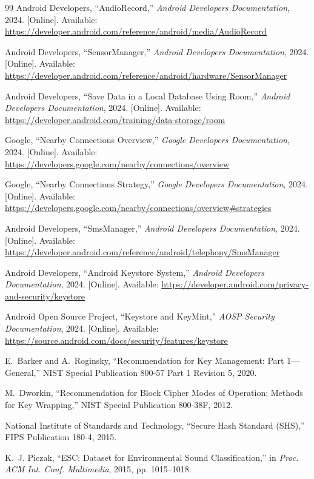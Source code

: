 \documentclass[conference]{IEEEtran}
\begin{document}
\begin{thebibliography}{99}
Android Developers, ``AudioRecord,'' \emph{Android Developers Documentation}, 2024. [Online]. Available: \url{https://developer.android.com/reference/android/media/AudioRecord}

Android Developers, ``SensorManager,'' \emph{Android Developers Documentation}, 2024. [Online]. Available: \url{https://developer.android.com/reference/android/hardware/SensorManager}

Android Developers, ``Save Data in a Local Database Using Room,'' \emph{Android Developers Documentation}, 2024. [Online]. Available: \url{https://developer.android.com/training/data-storage/room}

Google, ``Nearby Connections Overview,'' \emph{Google Developers Documentation}, 2024. [Online]. Available: \url{https://developers.google.com/nearby/connections/overview}

Google, ``Nearby Connections Strategy,'' \emph{Google Developers Documentation}, 2024. [Online]. Available: \url{https://developers.google.com/nearby/connections/overview#strategies}

Android Developers, ``SmsManager,'' \emph{Android Developers Documentation}, 2024. [Online]. Available: \url{https://developer.android.com/reference/android/telephony/SmsManager}

Android Developers, ``Android Keystore System,'' \emph{Android Developers Documentation}, 2024. [Online]. Available: \url{https://developer.android.com/privacy-and-security/keystore}

Android Open Source Project, ``Keystore and KeyMint,'' \emph{AOSP Security Documentation}, 2024. [Online]. Available: \url{https://source.android.com/docs/security/features/keystore}

E.~Barker and A.~Roginsky, ``Recommendation for Key Management: Part 1---General,'' NIST Special Publication 800-57 Part 1 Revision 5, 2020.

M.~Dworkin, ``Recommendation for Block Cipher Modes of Operation: Methods for Key Wrapping,'' NIST Special Publication 800-38F, 2012.

National Institute of Standards and Technology, ``Secure Hash Standard (SHS),'' FIPS Publication 180-4, 2015.

K.~J. Piczak, ``ESC: Dataset for Environmental Sound Classification,'' in \emph{Proc. ACM Int. Conf. Multimedia}, 2015, pp. 1015--1018.


\end{thebibliography}
\end{document}
